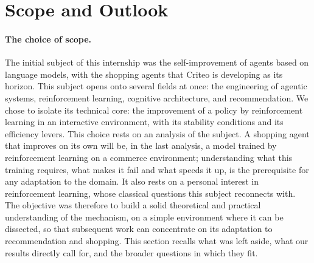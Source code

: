 \documentclass[11pt,a4paper]{article}
\begin{document}



\clearpage
\section{Scope and Outlook}

\paragraph{The choice of scope.} The initial subject of this internship was the self-improvement of agents based on language models, with the shopping agents that Criteo is developing as its horizon. This subject opens onto several fields at once: the engineering of agentic systems, reinforcement learning, cognitive architecture, and recommendation. We chose to isolate its technical core: the improvement of a policy by reinforcement learning in an interactive environment, with its stability conditions and its efficiency levers. This choice rests on an analysis of the subject. A shopping agent that improves on its own will be, in the last analysis, a model trained by reinforcement learning on a commerce environment; understanding what this training requires, what makes it fail and what speeds it up, is the prerequisite for any adaptation to the domain. It also rests on a personal interest in reinforcement learning, whose classical questions this subject reconnects with. The objective was therefore to build a solid theoretical and practical understanding of the mechanism, on a simple environment where it can be dissected, so that subsequent work can concentrate on its adaptation to recommendation and shopping. This section recalls what was left aside, what our results directly call for, and the broader questions in which they fit.
\end{document}
